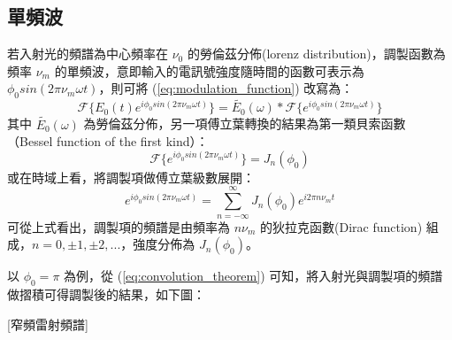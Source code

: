 \documentclass[class=NCU_thesis, crop=false]{standalone}
\begin{document}
\subsection{單頻波}
若入射光的頻譜為中心頻率在 $\nu_{0}$ 的勞倫茲分佈(lorenz distribution)，調製函數為頻率 $\nu_{m}$ 的單頻波，意即輸入的電訊號強度隨時間的函數可表示為 $\phi_{0} sin(2\pi \nu_{m} \omega t)$，則可將 (\ref{eq:modulation_function}) 改寫為：
\begin{equation}
\label{eq:convolution_theorem}
    \mathscr{F}\{E_{0}(t)e^{i\phi_{0} sin(2\pi \nu_{m} \omega t)}\}=\tilde{E_{0}}(\omega)*\mathscr{F}\{{e^{i\phi_{0} sin(2\pi \nu_{m} \omega t)}}\}
\end{equation}
其中 $\tilde{E_{0}}(\omega)$ 為勞倫茲分佈，另一項傅立葉轉換的結果為第一類貝索函數 （Bessel function of the first kind）：
\begin{equation}
    \mathscr{F}\{{e^{i\phi_{0} sin(2\pi \nu_{m} \omega t)}}\}=J_{n}(\phi_{0})
\end{equation}
或在時域上看，將調製項做傅立葉級數展開：
\begin{equation}
    e^{i\phi_{0} sin(2\pi \nu_{m} \omega t)}=\sum_{n=-\infty}^{\infty}J_{n}(\phi_{0})e^{i 2 \pi n \nu_{m} t}
\end{equation}
可從上式看出，調製項的頻譜是由頻率為 $n \nu_{m}$ 的狄拉克函數(Dirac function) 組成，$n=0, \pm1, \pm2, ...$，強度分佈為 $J_{n}(\phi_{0})$。

以 $\phi_{0}=\pi$ 為例，從 (\ref{eq:convolution_theorem}) 可知，將入射光與調製項的頻譜做摺積可得調製後的結果，如下圖：

[窄頻雷射頻譜]
\end{document}
